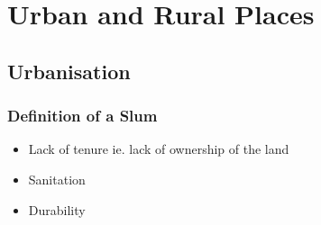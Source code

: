 \chapter{Urban and Rural Places}

\section{Urbanisation} \label{14/02/2025}
	\subsection{Definition of a Slum}
		\begin{itemize}
			\item Lack of tenure ie. lack of ownership of the land
			\item Sanitation
			\item Durability
		\end{itemize}
	
